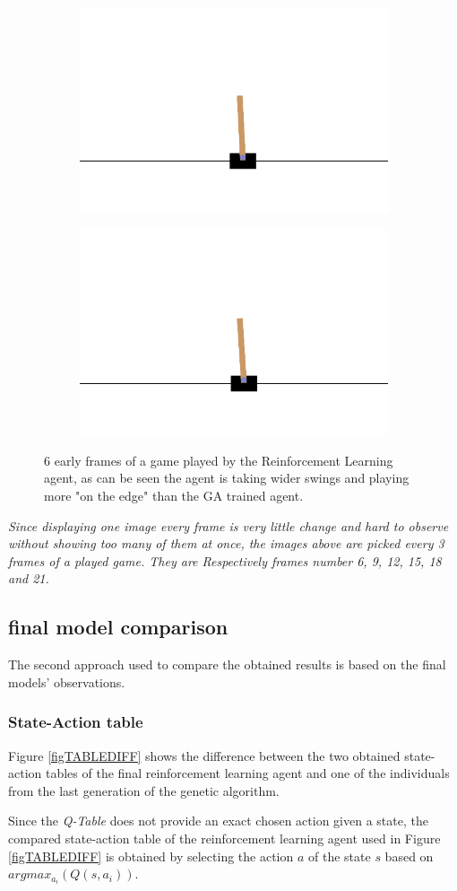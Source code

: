 \begin{figure}[H]
\begin{subfigure}
	\end{subfigure}
	\hfill
	\begin{subfigure}
		\centering
		\includegraphics[width=0.3\linewidth]{Images/frames/RL/18.png}
	\end{subfigure}
	\hfill
	\begin{subfigure}
		\centering
		\includegraphics[width=0.3\linewidth]{Images/frames/RL/21.png}
	\end{subfigure}
	\caption{6 early frames of a game played by the Reinforcement Learning agent, as can be seen the agent is taking wider swings and playing more "on the edge" than the GA trained agent.}
	\label{fig:framesRL}
\end{figure}

\textit{Since displaying one image every frame is very little change and hard to observe without showing too many of them at once, the images above are picked every 3 frames of a played game.
They are Respectively frames number 6, 9, 12, 15, 18 and 21.}

\subsection{final model comparison}

The second approach used to compare the obtained results is based on the final models' observations.

\subsubsection{State-Action table}

Figure \ref{figTABLEDIFF} shows the difference between the two obtained state-action tables of the final reinforcement learning agent and one of the individuals from the last generation of the genetic algorithm.

Since the \textit{Q-Table} does not provide an exact chosen action given a state, the compared state-action table of the reinforcement learning agent used in Figure \ref{figTABLEDIFF} is obtained by selecting the action $a$ of the state $s$ based on $argmax_{a_i} (Q(s,a_i))$.

